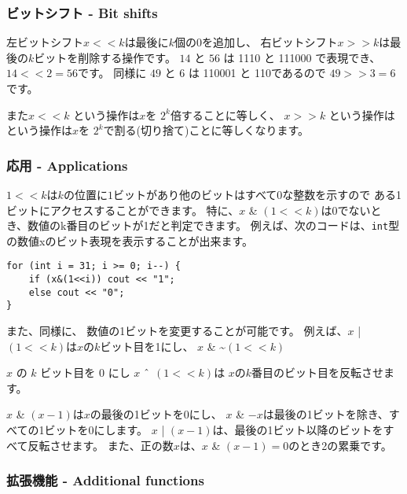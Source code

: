 \subsubsection{ビットシフト - Bit shifts}


左ビットシフト$x < < k$は最後に$k$個の0を追加し、
右ビットシフト$x > > k$は最後の$k$ビットを削除する操作です。
$14$ と $56$ は 1110 と 111000 で表現でき、$14 < < 2 = 56$です。
同様に
$49$ と $6$ は 110001 と 110であるので $49 > > 3 = 6$です。

また$x < < k$
という操作は$x$を $2^k$倍することに等しく、
$x > > k$
という操作は
という操作は$x$を $2^k$で割る(切り捨て)ことに等しくなります。

\subsubsection{応用 - Applications}

$1 < < k$は$k$の位置に$1$ビットがあり他のビットはすべて0な整数を示すので
ある1ビットにアクセスすることができます。
特に、$x$ \& $(1 < < k)$は0でないとき、数値のk番目のビットが1だと判定できます。
例えば、次のコードは、\texttt{int}型の数値xのビット表現を表示することが出来ます。

\begin{lstlisting}
for (int i = 31; i >= 0; i--) {
    if (x&(1<<i)) cout << "1";
    else cout << "0";
}
\end{lstlisting}

また、同様に、
数値の1ビットを変更することが可能です。
例えば、$x$ | $(1 < < k)$は$x$の$k$ビット目を1にし、
$x$ \& \textasciitilde $(1 < < k)$

$x$ の $k$ ビット目を 0 にし
$x$ $\XOR$ $(1 < < k)$は
$x$の$k$番目のビット目を反転させます。

$x$ \& $(x-1)$は$x$の最後の1ビットを0にし、
$x$ \& $-x$は最後の1ビットを除き、すべての1ビットを0にします。
$x$ | $(x-1)$は、最後の1ビット以降のビットをすべて反転させます。
また、正の数$x$は、$x$ \& $(x-1) = 0$のとき2の累乗です。

\subsubsection*{拡張機能 - Additional functions}

